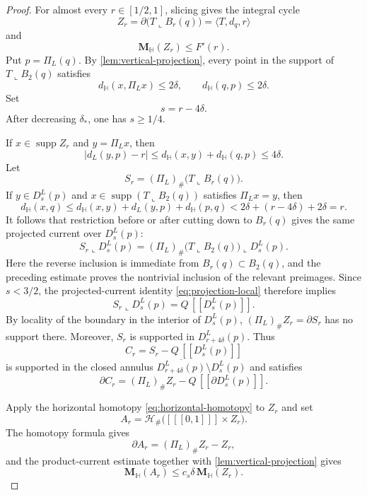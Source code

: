 \documentclass[11pt,reqno]{amsart}
\numberwithin{equation}{section}
\theoremstyle{definition}
\theoremstyle{remark}
\newcommand{\Hyp}{\mathbb H}
\newcommand{\Mass}{\mathbf M}
\newcommand{\supp}{\operatorname{supp}}
\newcommand{\restr}{\mathbin{\llcorner}}
\newcommand{\cur}[1]{\left[\!\left[#1\right]\!\right]}
\begin{document}
\begin{proof}
For almost every $r\in[1/2,1]$, slicing gives the integral cycle
\[
 Z_r=\partial\bigl(T\restr B_r(q)\bigr)
     =\langle T,d_q,r\rangle
\]
and
\begin{equation}\label{eq:slice-derivative}
 \Mass_{\Hyp}(Z_r)\le F'(r).
\end{equation}
Put $p=\Pi_L(q)$.  By \cref{lem:vertical-projection}, every point in the
support of $T\restr B_2(q)$ satisfies
\begin{equation}\label{eq:two-delta-displacements}
 d_{\Hyp}(x,\Pi_Lx)\le2\delta,
 \qquad
 d_{\Hyp}(q,p)\le2\delta.
\end{equation}
Set
\[
 s=r-4\delta.
\]
After decreasing $\delta_*$, one has $s\ge1/4$.

If $x\in\supp Z_r$ and $y=\Pi_Lx$, then
\begin{equation}\label{eq:projected-annulus}
 \bigl|d_L(y,p)-r\bigr|
 \le d_{\Hyp}(x,y)+d_{\Hyp}(q,p)
 \le4\delta.
\end{equation}
Let
\[
 S_r=(\Pi_L)_\#\bigl(T\restr B_r(q)\bigr).
\]
If $y\in D_s^L(p)$ and
$x\in\supp(T\restr B_2(q))$ satisfies $\Pi_Lx=y$, then
\[
 d_{\Hyp}(x,q)
 \le d_{\Hyp}(x,y)+d_L(y,p)+d_{\Hyp}(p,q)
 <2\delta+(r-4\delta)+2\delta=r.
\]
It follows that restriction before or after cutting down to $B_r(q)$
gives the same projected current over $D_s^L(p)$:
\[
 S_r\restr D_s^L(p)
 = (\Pi_L)_\#\bigl(T\restr B_2(q)\bigr)\restr D_s^L(p).
\]
Here the reverse inclusion is immediate from $B_r(q)\subset B_2(q)$, and
the preceding estimate proves the nontrivial inclusion of the relevant
preimages.  Since $s<3/2$, the projected-current identity
\eqref{eq:projection-local} therefore implies
\begin{equation}\label{eq:Sr-inner}
 S_r\restr D_s^L(p)=Q\,\cur{D_s^L(p)}.
\end{equation}
By locality of the boundary in the interior of $D_s^L(p)$,
$(\Pi_L)_\#Z_r=\partial S_r$ has no support there.  Moreover, $S_r$ is
supported in $D_{r+4\delta}^L(p)$.  Thus
\[
 C_r=S_r-Q\,\cur{D_s^L(p)}
\]
is supported in the closed annulus
$\overline{D_{r+4\delta}^L(p)}\setminus D_s^L(p)$ and satisfies
\begin{equation}\label{eq:boundary-Cr}
 \partial C_r=(\Pi_L)_\#Z_r-Q\,\cur{\partial D_s^L(p)}.
\end{equation}

Apply the horizontal homotopy \eqref{eq:horizontal-homotopy} to $Z_r$ and
set
\[
 A_r=\mathcal H_\#\bigl(\cur{[0,1]}\times Z_r\bigr).
\]
The homotopy formula gives
\begin{equation}\label{eq:Ar-boundary}
 \partial A_r=(\Pi_L)_\#Z_r-Z_r,
\end{equation}
and the product-current estimate together with
\cref{lem:vertical-projection} gives
\begin{equation}\label{eq:Ar-mass}
 \Mass_{\Hyp}(A_r)\le c_s\delta\,\Mass_{\Hyp}(Z_r).
\end{equation}


\end{proof}
\end{document}
